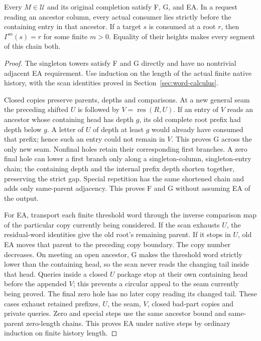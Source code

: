 \begin{theorem}\label{thm:invariants}
Every $M\in\mathscr U$ and its original completion satisfy F, G, and EA.
In a request reading an ancestor column, every actual consumer lies
strictly before the containing entry in that ancestor. If a target
$s$ is consumed at a root $r$, then $\Gamma^m(s)=r$ for some finite
$m>0$. Equality of their heights makes every segment of this chain both.
\end{theorem}
\begin{proof}
The singleton towers satisfy F and G directly and have no nontrivial
adjacent EA requirement. Use induction on the length of the actual finite native history,
with the scan identities proved in Section~\ref{sec:word-calculus}.

Closed copies preserve parents, depths and comparisons. At a new
general seam the preceding shifted $U$ is followed by
$V=\operatorname{res}(R,U)$. If an entry of $V$ reads an ancestor whose
containing head has depth $g$, its old complete root prefix had depth
below $g$. A letter of $U$ of depth at least $g$ would already have
consumed that prefix; hence such an entry could not remain in $V$.
This proves G across the only new seam. Nonfinal holes retain their
corresponding first branches. A zero final hole can lower a first
branch only along a singleton-column, singleton-entry chain; the
containing depth and the internal prefix depth shorten together,
preserving the strict gap. Special repetition has the same shortened
chain and adds only same-parent adjacency. This proves F and G
without assuming EA of the output.

For EA, transport each finite threshold word through the inverse
comparison map of the particular copy currently being considered.
If the scan exhausts $U$, the residual-word identities give the old
root's remaining parent. If it stops in $U$, old EA moves that parent
to the preceding copy boundary. The copy number decreases. On
meeting an open ancestor, G makes the threshold word strictly lower
than the containing head, so the scan never reads the changing tail
inside that head. Queries inside a closed $U$ package stop at their
own containing head before the appended $V$; this prevents a circular
appeal to the seam currently being proved. The final zero hole has no
later copy reading its changed tail. These cases exhaust retained
prefixes, $U$, the seam, $V$, closed bad-part copies and private
queries. Zero and special steps use the same ancestor bound and
same-parent zero-length chains. This proves EA under native steps by
ordinary induction on finite history length.


\end{proof}
